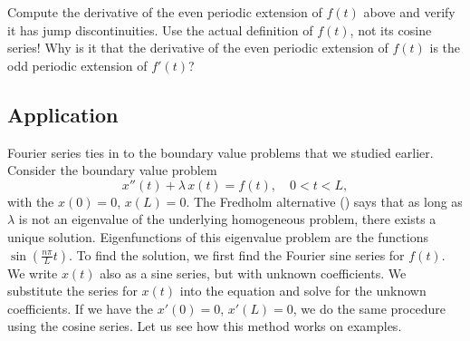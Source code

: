\begin{exercise}
\leavevmode
\begin{tasks}
\task Compute the derivative of the even periodic extension of $f(t)$ above and verify it
has jump discontinuities.  Use the actual definition of $f(t)$, not its cosine
series!
\task Why is it that the derivative of the even periodic extension of $f(t)$ is the
odd periodic extension of $f'(t)$?
\end{tasks}
\end{exercise}

\subsection{Application}

Fourier series ties in to the boundary value problems that
we studied earlier.
Consider the boundary value problem
\begin{equation*}
x''(t) + \lambda\, x(t) = f(t) , \quad 0 < t < L,
\end{equation*}
with the \emph{}
$x(0) = 0$, $x(L) = 0$.
The Fredholm alternative ()
says that
as long as $\lambda$ is not an eigenvalue of the underlying homogeneous
problem, there exists a unique solution.
Eigenfunctions of this eigenvalue problem are the functions
$\sin \left( \frac{n \pi}{L} t \right)$.
To find the solution,
we first find the Fourier sine series for $f(t)$.
We write $x(t)$ also as a sine series, but with unknown coefficients.  
We substitute the series for $x(t)$
into the equation and solve for the unknown coefficients.
If we have
the \emph{}
$x'(0) = 0$, $x'(L) = 0$, we do the same procedure using the cosine
series.
%
Let us see how this method works on examples.

